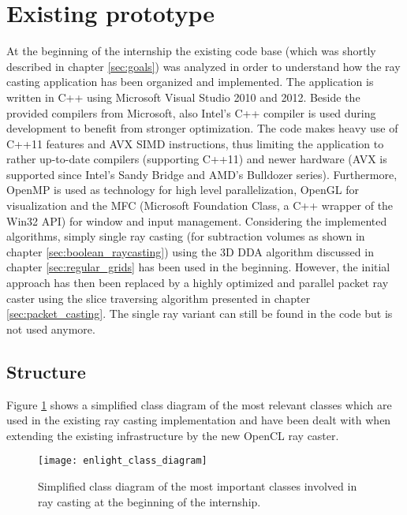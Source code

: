 \section{Existing prototype}
\label{sec:existing_prototype}

At the beginning of the internship the existing code base (which was shortly described in chapter \ref{sec:goals}) was analyzed in order to understand how the ray casting application has been organized and implemented. The application is written in C++ using Microsoft Visual Studio 2010 and 2012. Beside the provided compilers from Microsoft, also Intel's C++ compiler is used during development to benefit from stronger optimization. The code makes heavy use of C++11 features and AVX SIMD instructions, thus limiting the application to rather up-to-date compilers (supporting C++11) and newer hardware (AVX is supported since Intel's Sandy Bridge and AMD's Bulldozer series). Furthermore, OpenMP is used as technology for high level parallelization, OpenGL for visualization and the MFC (Microsoft Foundation Class, a C++ wrapper of the Win32 API) for window and input management.
Considering the implemented algorithms, simply single ray casting (for subtraction volumes as shown in chapter \ref{sec:boolean_raycasting}) using the 3D DDA algorithm discussed in chapter \ref{sec:regular_grids} has been used in the beginning. However, the initial approach has then been replaced by a highly optimized and parallel packet ray caster using the slice traversing algorithm presented in chapter \ref{sec:packet_casting}. The single ray variant can still be found in the code but is not used anymore.

\subsection{Structure}

Figure \ref{fig:enlight_class_diagram} shows a simplified class diagram of the most relevant classes which are used in the existing ray casting implementation and have been dealt with when extending the existing infrastructure by the new OpenCL ray caster.

\begin{figure}
\centering
\texttt{[image: enlight\_class\_diagram]}
\caption{Simplified class diagram of the most important classes involved in ray casting at the beginning of the internship.}
\label{fig:enlight_class_diagram}
\end{figure}

